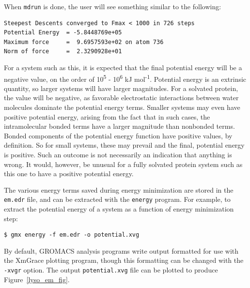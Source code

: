 \documentclass[9pt,tutorial]{livecoms}
\begin{document}
When \texttt{mdrun} is done, the user will see something similar to the following:

\begin{verbatim}
Steepest Descents converged to Fmax < 1000 in 726 steps
Potential Energy  = -5.8448769e+05
Maximum force     =  9.6957593e+02 on atom 736
Norm of force     =  2.3290928e+01
\end{verbatim}

For a system such as this, it is expected that the final potential energy will be a negative value, on the order of 10\textsuperscript{5} - 10\textsuperscript{6} kJ mol\textsuperscript{-1}. Potential energy is an extrinsic quantity, so larger systems will have larger magnitudes. For a solvated protein, the value will be negative, as favorable electrostatic interactions between water molecules dominate the potential energy terms. Smaller systems may even have positive potential energy, arising from the fact that in such cases, the intramolecular bonded terms have a larger magnitude than nonbonded terms. Bonded components of the potential energy function have positive values, by definition. So for small systems, these may prevail and the final, potential energy is positive. Such an outcome is not necessarily an indication that anything is wrong. It would, however, be unusual for a fully solvated protein system such as this one to have a positive potential energy.

The various energy terms saved during energy minimization are stored in the \texttt{em.edr} file, and can be extracted with the \texttt{energy} program. For example, to extract the potential energy of a system as a function of energy minimization step:

\begin{verbatim}
$ gmx energy -f em.edr -o potential.xvg
\end{verbatim}

By default, GROMACS analysis programs write output formatted for use with the XmGrace plotting program, though this formatting can be changed with the \texttt{-xvgr} option. The output \texttt{potential.xvg} file can be plotted to produce Figure~\ref{lyso_em_fig}.
\end{document}
